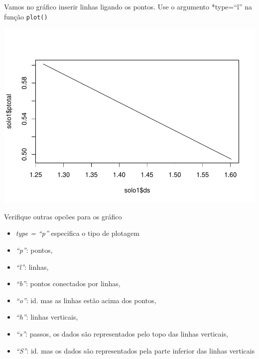 \documentclass[
]{book}
\newenvironment{Shaded}{\begin{snugshade}}{\end{snugshade}}
\newcommand{\DataTypeTok}[1]{\textcolor[rgb]{0.13,0.29,0.53}{#1}}
\newcommand{\KeywordTok}[1]{\textcolor[rgb]{0.13,0.29,0.53}{\textbf{#1}}}
\newcommand{\NormalTok}[1]{#1}
\newcommand{\OperatorTok}[1]{\textcolor[rgb]{0.81,0.36,0.00}{\textbf{#1}}}
\newcommand{\StringTok}[1]{\textcolor[rgb]{0.31,0.60,0.02}{#1}}
\providecommand{\tightlist}{%
  \setlength{\itemsep}{0pt}\setlength{\parskip}{0pt}}
\begin{document}
Vamos no gráfico inserir linhas ligando os pontos. Use o argumento *type=``l'' na função \texttt{plot()}

\begin{Shaded}
\end{Shaded}

\includegraphics{TudodoR_files/figure-latex/unnamed-chunk-153-1.pdf}

Verifique outras opcões para os gráfico

\begin{itemize}
\tightlist
\item
  \emph{type = ``p''} especifica o tipo de plotagem
\item
  \emph{``p''}: pontos,
\item
  \emph{``l''}: linhas,
\item
  \emph{``b''}: pontos conectados por linhas,
\item
  \emph{``o''}: id. mas as linhas estão acima dos pontos,
\item
  \emph{``h''}: linhas verticais,
\item
  \emph{``s''}: passos, os dados são representados pelo topo das linhas verticais,
\item
  \emph{``S''}: id. mas os dados são representados pela parte inferior das linhas verticais
\end{itemize}
\end{document}
